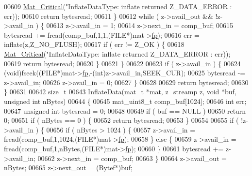 \begin{DoxyCode}
{{{{{{{{{{{{{{{{{{00609         \hyperlink{group__mat__util_gaf51f2bfbb5580f575e4dd79757e2b80c}{Mat\_Critical}(\textcolor{stringliteral}{"InflateDataType: inflate returned %
      Z\_DATA\_ERROR : err));
00610         \textcolor{keywordflow}{return} bytesread;
00611     \}
00612     \textcolor{keywordflow}{while} ( z->avail\_out && !z->avail\_in ) \{
00613         z->avail\_in = 1;
00614         z->next\_in = comp\_buf;
00615         bytesread += fread(comp\_buf,1,1,(FILE*)mat->\hyperlink{struct__mat__t_a85f562e407ca9ad4d2a6e14f839432b7}{fp});
00616         err = inflate(z,Z\_NO\_FLUSH);
00617         \textcolor{keywordflow}{if} ( err != Z\_OK ) \{
00618             \hyperlink{group__mat__util_gaf51f2bfbb5580f575e4dd79757e2b80c}{Mat\_Critical}(\textcolor{stringliteral}{"InflateDataType: inflate returned %
      Z\_DATA\_ERROR : err));
00619             \textcolor{keywordflow}{return} bytesread;
00620         \}
00621     \}
00622 
00623     \textcolor{keywordflow}{if} ( z->avail\_in ) \{
00624         (void)fseek((FILE*)mat->\hyperlink{struct__mat__t_a85f562e407ca9ad4d2a6e14f839432b7}{fp},-(int)z->avail\_in,SEEK\_CUR);
00625         bytesread -= z->avail\_in;
00626         z->avail\_in = 0;
00627     \}
00628 
00629     \textcolor{keywordflow}{return} bytesread;
00630 \}
00631 
00642 \textcolor{keywordtype}{size\_t}
00643 InflateData(\hyperlink{struct__mat__t}{mat\_t} *mat, z\_streamp z, \textcolor{keywordtype}{void} *buf, \textcolor{keywordtype}{unsigned} \textcolor{keywordtype}{int} nBytes)
00644 \{
00645     mat\_uint8\_t comp\_buf[1024];
00646     \textcolor{keywordtype}{int}    err;
00647     \textcolor{keywordtype}{unsigned} \textcolor{keywordtype}{int} bytesread = 0;
00648 
00649     \textcolor{keywordflow}{if} ( buf == NULL )
00650         \textcolor{keywordflow}{return} 0;
00651     \textcolor{keywordflow}{if} ( nBytes == 0 ) \{
00652         \textcolor{keywordflow}{return} bytesread;
00653     \}
00654 
00655     \textcolor{keywordflow}{if} ( !z->avail\_in ) \{
00656         \textcolor{keywordflow}{if} ( nBytes > 1024 ) \{
00657             z->avail\_in = fread(comp\_buf,1,1024,(FILE*)mat->\hyperlink{struct__mat__t_a85f562e407ca9ad4d2a6e14f839432b7}{fp});
00658         \} \textcolor{keywordflow}{else} \{
00659             z->avail\_in = fread(comp\_buf,1,nBytes,(FILE*)mat->\hyperlink{struct__mat__t_a85f562e407ca9ad4d2a6e14f839432b7}{fp});
00660         \}
00661         bytesread += z->avail\_in;
00662         z->next\_in = comp\_buf;
00663     \}
00664     z->avail\_out = nBytes;
00665     z->next\_out = (Bytef*)buf;
}}}}}}}}}}}}}}}}}}}}
\end{DoxyCode}
